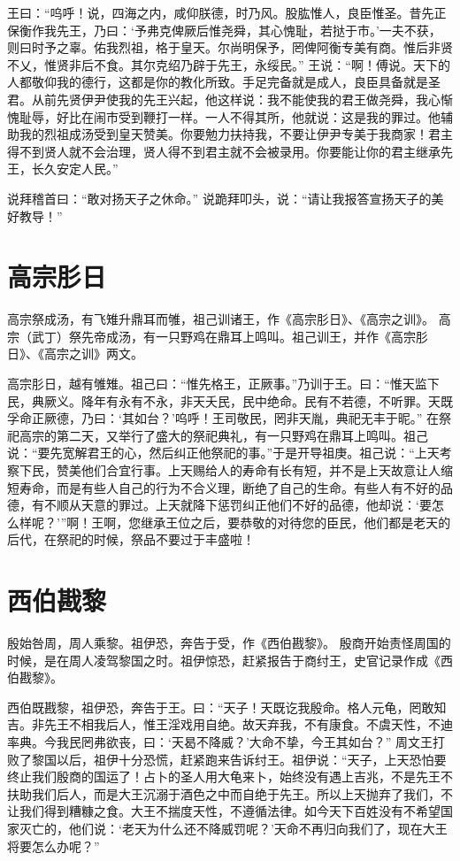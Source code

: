 \documentclass[a4paper,12pt,UTF8,twoside]{ctexbook}
\begin{document}
王曰：“呜呼！说，四海之内，咸仰朕德，时乃风。股肱惟人，良臣惟圣。昔先正保衡作我先王，乃曰：‘予弗克俾厥后惟尧舜，其心愧耻，若挞于市。’一夫不获，则曰时予之辜。佑我烈祖，格于皇天。尔尚明保予，罔俾阿衡专美有商。惟后非贤不乂，惟贤非后不食。其尔克绍乃辟于先王，永绥民。”
王说：“啊！傅说。天下的人都敬仰我的德行，这都是你的教化所致。手足完备就是成人，良臣具备就是圣君。从前先贤伊尹使我的先王兴起，他这样说：我不能使我的君王做尧舜，我心惭愧耻辱，好比在闹市受到鞭打一样。一人不得其所，他就说：这是我的罪过。他辅助我的烈祖成汤受到皇天赞美。你要勉力扶持我，不要让伊尹专美于我商家！君主得不到贤人就不会治理，贤人得不到君主就不会被录用。你要能让你的君主继承先王，长久安定人民。”

说拜稽首曰：“敢对扬天子之休命。”
说跪拜叩头，说：“请让我报答宣扬天子的美好教导！”\\

\chapter{高宗肜日}

高宗祭成汤，有飞雉升鼎耳而雊，祖己训诸王，作《高宗肜日》、《高宗之训》。
高宗（武丁）祭先帝成汤，有一只野鸡在鼎耳上鸣叫。祖己训王，并作《高宗肜日》、《高宗之训》两文。

高宗肜日，越有雊雉。祖己曰：“惟先格王，正厥事。”乃训于王。曰：“惟天监下民，典厥义。降年有永有不永，非天夭民，民中绝命。民有不若德，不听罪。天既孚命正厥德，乃曰：‘其如台？’呜呼！王司敬民，罔非天胤，典祀无丰于昵。”
在祭祀高宗的第二天，又举行了盛大的祭祀典礼，有一只野鸡在鼎耳上鸣叫。祖己说：“要先宽解君王的心，然后纠正他祭祀的事。”于是开导祖庚。祖己说：“上天考察下民，赞美他们合宜行事。上天赐给人的寿命有长有短，并不是上天故意让人缩短寿命，而是有些人自己的行为不合义理，断绝了自己的生命。有些人有不好的品德，有不顺从天意的罪过。上天就降下惩罚纠正他们不好的品德，他却说：‘要怎么样呢？’”啊！王啊，您继承王位之后，要恭敬的对待您的臣民，他们都是老天的后代，在祭祀的时候，祭品不要过于丰盛啦！

\chapter{西伯戡黎}

殷始咎周，周人乘黎。祖伊恐，奔告于受，作《西伯戡黎》。
殷商开始责怪周国的时候，是在周人凌驾黎国之时。祖伊惊恐，赶紧报告于商纣王，史官记录作成《西伯戡黎》。

西伯既戡黎，祖伊恐，奔告于王。曰：“天子！天既讫我殷命。格人元龟，罔敢知吉。非先王不相我后人，惟王淫戏用自绝。故天弃我，不有康食。不虞天性，不迪率典。今我民罔弗欲丧，曰：‘天曷不降威？’大命不挚，今王其如台？”
周文王打败了黎国以后，祖伊十分恐慌，赶紧跑来告诉纣王。祖伊说：“天子，上天恐怕要终止我们殷商的国运了！占卜的圣人用大龟来卜，始终没有遇上吉兆，不是先王不扶助我们后人，而是大王沉溺于酒色之中而自绝于先王。所以上天抛弃了我们，不让我们得到糟糠之食。大王不揣度天性，不遵循法律。如今天下百姓没有不希望国家灭亡的，他们说：‘老天为什么还不降威罚呢？’天命不再归向我们了，现在大王将要怎么办呢？”
\end{document}
